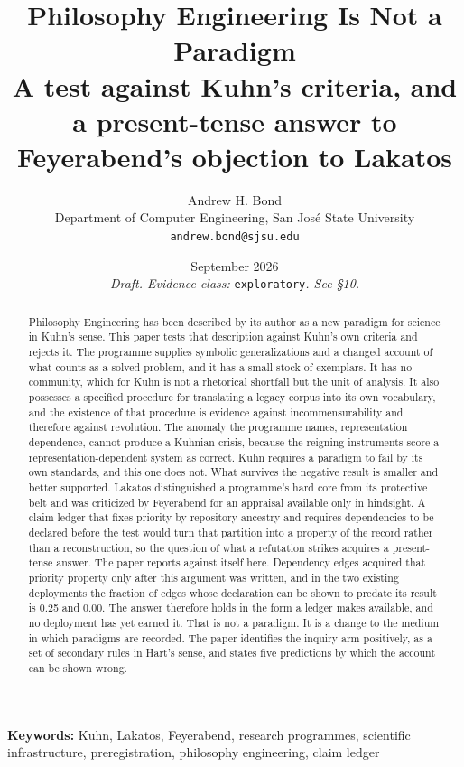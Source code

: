 \documentclass[11pt,letterpaper]{article}
\title{\vspace{-1.2cm}\textbf{Philosophy Engineering Is Not a Paradigm}\\[0.5em]
\large A test against Kuhn's criteria, and a present-tense answer to\\
Feyerabend's objection to Lakatos}
\author{Andrew H. Bond\\
\small Department of Computer Engineering, San Jos\'{e} State University\\
\small \texttt{andrew.bond@sjsu.edu}}
\date{\small September 2026 \\[0.4em]
\small\textit{Draft. Evidence class:} \texttt{exploratory}\textit{. See \S10.}}
\begin{document}
\maketitle

\begin{abstract}
\noindent
Philosophy Engineering has been described by its author as a new paradigm for
science in Kuhn's sense. This paper tests that description against Kuhn's own
criteria and rejects it. The programme supplies symbolic generalizations and a
changed account of what counts as a solved problem, and it has a small stock of
exemplars. It has no community, which for Kuhn is not a rhetorical shortfall but
the unit of analysis. It also possesses a specified procedure for translating a
legacy corpus into its own vocabulary, and the existence of that procedure is
evidence against incommensurability and therefore against revolution. The
anomaly the programme names, representation dependence, cannot produce a
Kuhnian crisis, because the reigning instruments score a representation-dependent
system as correct. Kuhn requires a paradigm to fail by its own standards, and
this one does not. What survives the negative result is smaller and better
supported. Lakatos distinguished a programme's hard core from its protective
belt and was criticized by Feyerabend for an appraisal available only in
hindsight. A claim ledger that fixes priority by repository ancestry and
requires dependencies to be declared before the test would turn that partition
into a property of the record rather than a reconstruction, so the question of
what a refutation strikes acquires a present-tense answer. The paper reports
against itself here. Dependency edges acquired that priority property only after
this argument was written, and in the two existing deployments the fraction of
edges whose declaration can be shown to predate its result is 0.25 and 0.00. The
answer therefore holds in the form a ledger makes available, and no deployment
has yet earned it. That is not a paradigm. It
is a change to the medium in which paradigms are recorded. The paper identifies
the inquiry arm positively, as a set of secondary rules in Hart's sense, and
states five predictions by which the account can be shown wrong.
\end{abstract}

\vspace{0.6em}
\noindent\textbf{Keywords:} Kuhn, Lakatos, Feyerabend, research programmes,
scientific infrastructure, preregistration, philosophy engineering, claim ledger
\end{document}
